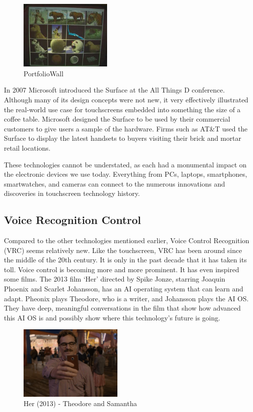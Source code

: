 \documentclass{article}
\begin{document}
\begin{figure}[!ht]
    \caption{PortfolioWall}
    \label{image:PFW}
    \centering
    \includegraphics[width=0.4\textwidth]{pics/pf_wall.jpg}
\end{figure}

In 2007 Microsoft introduced the Surface at the All Things D conference. Although many of its design concepts were not new, it very effectively illustrated the real-world use case for touchscreens embedded into something the size of a coffee table. Microsoft designed the Surface to be used by their commercial customers to give users a sample of the hardware. Firms such as AT\&T used the Surface to display the latest handsets to buyers visiting their brick and mortar retail locations.

These technologies cannot be understated, as each had a monumental impact on the electronic devices we use today. Everything from PCs, laptops, smartphones, smartwatches, and cameras can connect to the numerous innovations and discoveries in touchscreen technology history.
\cite{ref8}

\subsection{Voice Recognition Control}
Compared to the other technologies mentioned earlier, Voice Control Recognition (VRC) seems relatively new. Like the touchscreen, VRC has been around since the middle of the 20th century. It is only in the past decade that it has taken its toll. Voice control is becoming more and more prominent. It has even inspired some films. The 2013 film ‘Her’ directed by Spike Jonze, starring Joaquin Phoenix and Scarlet Johansson, has an AI operating system that can learn and adapt. Pheonix plays Theodore, who is a writer, and Johansson plays the AI OS. They have deep, meaningful conversations in the film that show how advanced this AI OS is and possibly show where this technology’s future is going. 
\cite{ref9}

\begin{figure}[H]
    \caption{Her (2013) - Theodore and Samantha}
    \label{image:HER}
    \centering
    \includegraphics[width=0.45\textwidth]{pics/Her.png}
\end{figure}
\end{document}
